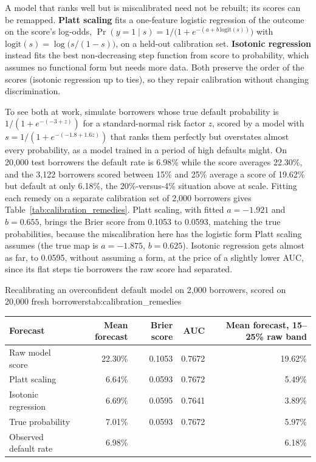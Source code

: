 \documentclass[../ai_in_finance]{subfiles}
\begin{document}
A model that ranks well but is miscalibrated need not be rebuilt; its scores can be remapped. \textbf{Platt scaling} \parencite{platt1999probabilistic} fits a one-feature logistic regression of the outcome on the score's log-odds, $\Pr(y=1 \mid s) = 1/\big(1+e^{-(a + b\,\text{logit}(s))}\big)$ with $\text{logit}(s) = \log\big(s/(1-s)\big)$, on a held-out calibration set. \textbf{Isotonic regression} \parencite{zadrozny2002transforming} instead fits the best non-decreasing step function from score to probability, which assumes no functional form but needs more data. Both preserve the order of the scores (isotonic regression up to ties), so they repair calibration without changing discrimination.

To see both at work, simulate borrowers whose true default probability is $1/(1+e^{-(-3+z)})$ for a standard-normal risk factor $z$, scored by a model with $s = 1/(1+e^{-(-1.8+1.6z)})$ that ranks them perfectly but overstates almost every probability, as a model trained in a period of high defaults might. On 20{,}000 test borrowers the default rate is 6.98\% while the score averages 22.30\%, and the 3{,}122 borrowers scored between 15\% and 25\% average a score of 19.62\% but default at only 6.18\%, the 20\%-versus-4\% situation above at scale. Fitting each remedy on a separate calibration set of 2{,}000 borrowers gives Table~\ref{tab:calibration_remedies}. Platt scaling, with fitted $a = -1.921$ and $b = 0.655$, brings the Brier score from 0.1053 to 0.0593, matching the true probabilities, because the miscalibration here has the logistic form Platt scaling assumes (the true map is $a = -1.875$, $b = 0.625$). Isotonic regression gets almost as far, to 0.0595, without assuming a form, at the price of a slightly lower AUC, since its flat steps tie borrowers the raw score had separated.

\begin{booktable}[htbp]{Recalibrating an overconfident default model on 2{,}000 borrowers, scored on 20{,}000 fresh borrowers}{tab:calibration_remedies}
\begin{tabular}{lrrrr}
\toprule
Forecast & Mean forecast & Brier score & AUC & Mean forecast, 15--25\% raw band \\
\midrule
Raw model score    & 22.30\% & 0.1053 & 0.7672 & 19.62\% \\
Platt scaling      & 6.64\%  & 0.0593 & 0.7672 & 5.49\% \\
Isotonic regression & 6.69\% & 0.0595 & 0.7641 & 3.89\% \\
True probability   & 7.01\%  & 0.0593 & 0.7672 & 5.97\% \\
\midrule
Observed default rate & 6.98\% & & & 6.18\% \\
\bottomrule
\end{tabular}
\end{booktable}
\end{document}

